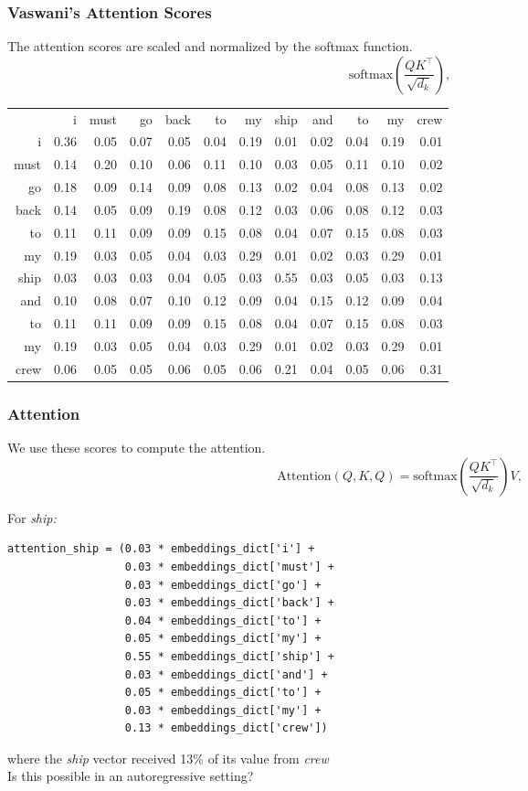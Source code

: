 \begin{frame}[fragile]
\frametitle{Vaswani's Attention Scores}\color{structure}
The attention scores are scaled and normalized by the softmax function.
\[
 \text{softmax}(\frac{{Q}  {K}^\intercal}{\sqrt{d_k}}),
\]

\begin{scriptsize}
\begin{tabular}{rrrrrrrrrrrr}
&i&must&go&back&to&my&ship&and&to&my&crew\\
i&0.36&0.05&0.07&0.05&0.04&0.19&0.01&0.02&0.04&0.19&0.01\\
must&0.14&0.20&0.10&0.06&0.11&0.10&0.03&0.05&0.11&0.10&0.02\\
go&0.18&0.09&0.14&0.09&0.08&0.13&0.02&0.04&0.08&0.13&0.02\\
back&0.14&0.05&0.09&0.19&0.08&0.12&0.03&0.06&0.08&0.12&0.03\\
to&0.11&0.11&0.09&0.09&0.15&0.08&0.04&0.07&0.15&0.08&0.03\\
my&0.19&0.03&0.05&0.04&0.03&0.29&0.01&0.02&0.03&0.29&0.01\\
ship&0.03&0.03&0.03&0.04&0.05&0.03&0.55&0.03&0.05&0.03&0.13\\
and&0.10&0.08&0.07&0.10&0.12&0.09&0.04&0.15&0.12&0.09&0.04\\
to&0.11&0.11&0.09&0.09&0.15&0.08&0.04&0.07&0.15&0.08&0.03\\
my&0.19&0.03&0.05&0.04&0.03&0.29&0.01&0.02&0.03&0.29&0.01\\
crew&0.06&0.05&0.05&0.06&0.05&0.06&0.21&0.04&0.05&0.06&0.31\\
\end{tabular}
\end{scriptsize}
\end{frame}

\begin{frame}[fragile]
\frametitle{Attention}\color{structure}
We use these scores to compute the attention.
\[
\text{Attention}({Q}, {K}, {Q}) = \text{softmax}(\frac{{Q}  {K}^\intercal}{\sqrt{d_k}})  {V},
\]

For \textit{ship:}
\begin{scriptsize}
\begin{verbatim}
attention_ship = (0.03 * embeddings_dict['i'] + 
                  0.03 * embeddings_dict['must'] + 
                  0.03 * embeddings_dict['go'] +
                  0.03 * embeddings_dict['back'] +
                  0.04 * embeddings_dict['to'] + 
                  0.05 * embeddings_dict['my'] +
                  0.55 * embeddings_dict['ship'] +
                  0.03 * embeddings_dict['and'] +
                  0.05 * embeddings_dict['to'] +
                  0.03 * embeddings_dict['my'] +
                  0.13 * embeddings_dict['crew'])
\end{verbatim}
\end{scriptsize}
where the \textit{ship} vector received 13\% of its value from \textit{crew}\\
Is this possible in an autoregressive setting?
\end{frame}

